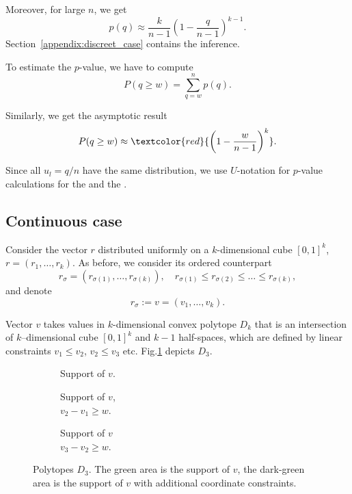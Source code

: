 Moreover, for large $n$, we get
\[
p(q) \approx \frac{k}{n-1}\left(1 - \frac{q}{n-1} \right)^{k-1}.
\]
Section~\ref{appendix:discreet_case} contains the inference.

To estimate the $p$-value, we have to compute
\[
P(q \ge w) = \sum^{n}_{q = w} p(q).
\]

Similarly, we get the asymptotic result
\[
P(q \ge w) \approx \textcolor{red}{\left(1 - \frac{w}{n-1} \right)^{k}}.
\]


Since all $u_l = q/n$ have the same distribution, we use $U$-notation for $p$-value calculations for the  and the .

\subsection{Continuous case}

Consider the vector $r$ distributed uniformly on a $k$-dimensional cube $[0, 1]^{k}$, $r = (r_1, \dots, r_k)$. As before, we consider its ordered counterpart
\[
r_{\sigma} = (r_{\sigma(1)}, \dots, r_{\sigma(k)}), \quad r_{\sigma(1)} \leq r_{\sigma(2)} \leq \dots \leq r_{\sigma(k)},
\]
and denote 
\[
    r_{\sigma} := v = (v_1, \dots, v_k).
\]

Vector $v$ takes values in $k$-dimensional convex polytope $D_k$ that is 
an intersection of $k$--dimensional cube $[0, 1]^{k}$ and 
$k-1$ half-spaces, which are defined by linear constraints $v_1 \le v_2$, $v_2 \le v_3$ etc.
Fig.\ref{fig:polytop} depicts $D_3$. 
\begin{figure}
     \centering
     \begin{subfigure}[b]{0.3\textwidth}
         \centering 
         \caption{Support of $v$.
         \\\hspace{\textwidth} 
        }
         \label{fig:polytop}
     \end{subfigure}
     \begin{subfigure}[b]{0.3\textwidth}
         \centering 
         \caption{Support of $v$, 
         \\\hspace{\textwidth}
         $v_2 - v_1 \ge w$.}
         \label{fig:polytop1}
     \end{subfigure}
     \begin{subfigure}[b]{0.3\textwidth}
         \centering 
         \caption{Support of $v$ \\\hspace{\textwidth}$v_3 - v_2 \ge w$.}
         \label{fig:polytop2}
     \end{subfigure}
    \caption{Polytopes $D_3$. The green area is the support of $v$, the dark-green area is the support of $v$ with additional coordinate constraints.}
\end{figure}

